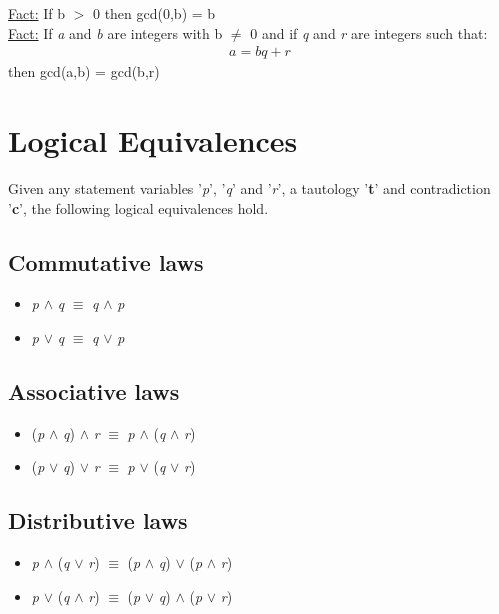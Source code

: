\documentclass{article}
\begin{document}
\underline{Fact:} If b $>$ 0 then gcd(0,b) = b \\

\underline{Fact:} If \textit{a} and \textit{b} are integers with b $\neq$ 0 and if \textit{q} and \textit{r} are integers such that:
\begin{align}
a = bq + r
\end{align}
then gcd(a,b) = gcd(b,r)

\section{Logical Equivalences}

Given any statement variables '\textit{p}', '\textit{q}' and '\textit{r}', a tautology '\textbf{t}' and contradiction '\textbf{c}', the following
logical equivalences hold.


\subsection{Commutative laws}
\begin{itemize} 
\item \textit{p} $\wedge$ \textit{q} $\equiv$ \textit{q} $\wedge$ \textit{p}
\item \textit{p} $\lor$ \textit{q} $\equiv$ \textit{q} $\lor$ \textit{p}
\end{itemize}

\subsection{Associative laws}
\begin{itemize}
\item (\textit{p} $\wedge$ \textit{q}) $\wedge$ \textit{r} $\equiv$ \textit{p} $\wedge$ (\textit{q} $\wedge$ \textit{r})
\item (\textit{p} $\lor$ \textit{q}) $\lor$ \textit{r} $\equiv$ \textit{p} $\lor$ (\textit{q} $\lor$ \textit{r})
\end{itemize}

\subsection{Distributive laws}
\begin{itemize}
\item \textit{p} $\wedge$ (\textit{q} $\lor$ \textit{r}) $\equiv$ (\textit{p} $\wedge$ \textit{q}) $\lor$ (\textit{p} $\wedge$ \textit{r})
\item \textit{p} $\lor$ (\textit{q} $\wedge$ \textit{r}) $\equiv$ (\textit{p} $\lor$ \textit{q}) $\wedge$ (\textit{p} $\lor$ \textit{r})
\end{itemize}
\end{document}
